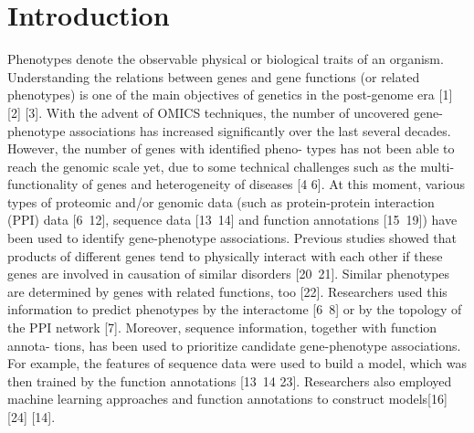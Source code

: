 \documentclass{bioinfo}
\begin{document}
\section{Introduction}

Phenotypes denote the observable physical or biological traits of
an organism. Understanding the relations between genes and gene
functions (or related phenotypes) is one of the main objectives of
genetics in the post-genome era [1] [2] [3]. With the advent of
OMICS techniques, the number of uncovered gene-phenotype
associations has increased significantly over the last several
decades. However, the number of genes with identified pheno-
types has not been able to reach the genomic scale yet, due to
some technical challenges such as the multi-functionality of genes
and heterogeneity of diseases [4 6]. At this moment, various types
of proteomic and/or genomic data (such as protein-protein
interaction (PPI) data [6\ 12], sequence data [13\ 14] and function
annotations [15\ 19]) have been used to identify gene-phenotype
associations. Previous studies showed that products of different
genes tend to physically interact with each other if these genes are
involved in causation of similar disorders [20\ 21]. Similar
phenotypes are determined by genes with related functions, too
[22]. Researchers used this information to predict phenotypes by
the interactome [6\ 8] or by the topology of the PPI network [7].
Moreover, sequence information, together with function annota-
tions, has been used to prioritize candidate gene-phenotype
associations. For example, the features of sequence data were used
to build a model, which was then trained by the function
annotations [13\ 14 23]. Researchers also employed machine
learning approaches and function annotations to construct
models[16] [24] [14].
\end{document}
